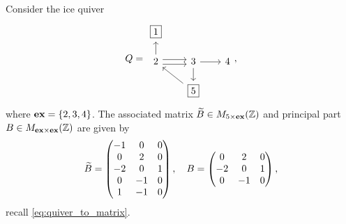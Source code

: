 \begin{example}
	Consider the ice quiver
	\begin{equation*}
		Q = \begin{tikzcd}[sep=scriptsize]
			\boxed{1} \\
			2 \uar \rar[shift left]\rar[shift right] & 3  \rar \dar & 4 \\
			& \boxed{5} \ular
		\end{tikzcd},
	\end{equation*}
	where $\mathbf{ex} = \{2,3,4\}$. The associated matrix $\widetilde{B} \in M_{5 \times \mathbf{ex}}(\mathbb{Z})$ and
	principal part $B \in M_{\mathbf{ex} \times \mathbf{ex}}(\mathbb{Z})$ are given by
	\begin{equation*}
		\widetilde{B} =
		\begin{pmatrix}
			-1 & 0  & 0 \\
			0  & 2  & 0 \\
			-2 & 0  & 1 \\
			0  & -1 & 0 \\
			1  & -1 & 0
		\end{pmatrix}
		,\quad B =
		\begin{pmatrix}
			0  & 2  & 0 \\
			-2 & 0  & 1 \\
			0  & -1 & 0
		\end{pmatrix},
	\end{equation*}
	recall \cref{eq:quiver_to_matrix}.
\end{example}

